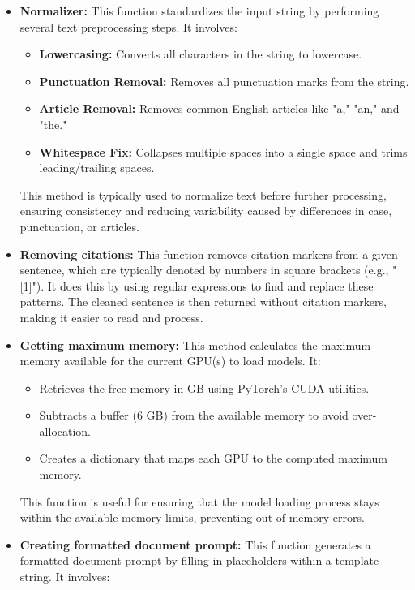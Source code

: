 \begin{itemize}
    \item \textbf{Normalizer:} This function standardizes the input string by performing several text preprocessing steps. It involves:

    \begin{itemize}
        \item \textbf{Lowercasing:} Converts all characters in the string to lowercase.
        \item \textbf{Punctuation Removal:} Removes all punctuation marks from the string.
        \item \textbf{Article Removal:} Removes common English articles like "a," "an," and "the."
        \item \textbf{Whitespace Fix:} Collapses multiple spaces into a single space and trims leading/trailing spaces.
    \end{itemize}

    This method is typically used to normalize text before further processing, ensuring consistency and reducing variability caused by differences in case, punctuation, or articles.

    \item \textbf{Removing citations:} This function removes citation markers from a given sentence, which are typically denoted by numbers in square brackets (e.g., "[1]"). It does this by using regular expressions to find and replace these patterns. The cleaned sentence is then returned without citation markers, making it easier to read and process.

    \item \textbf{Getting maximum memory:} This method calculates the maximum memory available for the current GPU(s) to load models. It:

    \begin{itemize}
        \item Retrieves the free memory in GB using PyTorch’s CUDA utilities.
        \item Subtracts a buffer (6 GB) from the available memory to avoid over-allocation.
        \item Creates a dictionary that maps each GPU to the computed maximum memory.
    \end{itemize}

    This function is useful for ensuring that the model loading process stays within the available memory limits, preventing out-of-memory errors.

    \item \textbf{Creating formatted document prompt:} This function generates a formatted document prompt by filling in placeholders within a template string. It involves:


\end{itemize}

